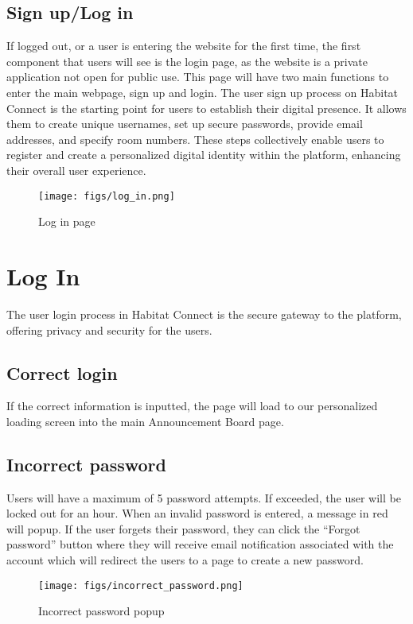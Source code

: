 \documentclass[conference]{IEEEtran}
\begin{document}
\subsection{Sign up/Log in}
If logged out, or a user is entering the website for the first time, the first component that users will see is the login page, as the website is a private application not open for public use. This page will have two main functions to enter the main webpage, sign up and login. The user sign up process on Habitat Connect is the starting point for users to establish their digital presence. It allows them to create unique usernames, set up secure passwords, provide email addresses, and specify room numbers. These steps collectively enable users to register and create a personalized digital identity within the platform, enhancing their overall user experience.
    \begin{figure}[H]
    \centering
    \texttt{[image: figs/log\_in.png]}
    \caption{Log in page}
    \label{fig:Log in page}
    \end{figure}
    
\section*{Log In}
The user login process in Habitat Connect is the secure gateway to the platform, offering privacy and security for the users.
\subsection*{Correct login}
If the correct information is inputted, the page will load to our personalized loading screen into the main Announcement Board page.
\subsection*{Incorrect password}
Users will have a maximum of 5 password attempts. If exceeded, the user will be locked out for an hour. When an invalid password is entered, a message in red will popup. If the user forgets their password, they can click the “Forgot password” button where they will receive email notification associated with the account which will redirect the users to a page to create a new password.
    \begin{figure}[H]
    \centering
    \texttt{[image: figs/incorrect\_password.png]}
    \caption{Incorrect password popup}
    \label{fig:Incorrect password popup}
    \end{figure}
\end{document}
